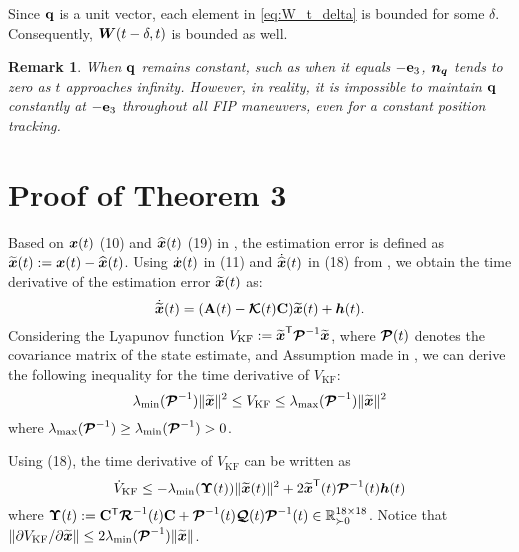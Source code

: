 \documentclass[journal,onecolumn]{IEEEtran}
\newtheorem{theorem}{Theorem}
\newtheorem{remark}{Remark}
\begin{document}
Since $\dir$ is a unit vector, each element in \eqref{eq:W_t_delta} is bounded for some $\delta$.
Consequently, $\boldsymbol{W}(t-\delta,t)$ is bounded as well.

\begin{remark}
	When $\dir$ remains constant, such as when it equals $-\ez$, $\boldsymbol{n_{q}}$ tends to zero as $t$ approaches infinity.
	However, in reality, it is impossible to maintain $\dir$ constantly at $-\ez$ throughout all FIP maneuvers, even for a constant position tracking.
\end{remark}

\section{Proof of Theorem 3}\label{sec:x_tilde}
%
Based on $\boldsymbol{x}(t)$ (10) and $\widehat{\boldsymbol{x}}(t)$ (19) in \cite{2024_Yang_TIE}, the estimation error is defined as $\widetilde{\boldsymbol{x}}(t):=\boldsymbol{x}(t)-\widehat{\boldsymbol{x}}(t)$.
%
%
Using $\dot{{\boldsymbol{x}}}(t)$ in (11) and $\dot{\widehat{\boldsymbol{x}}}(t)$ in (18) from \cite{2024_Yang_TIE}, we obtain the time derivative of the estimation error $\widetilde{\boldsymbol{x}}(t)$ as:
%
\begin{equation}
	\dot{\widetilde{\boldsymbol{x}}}(t)=({\bf A}(t)-\boldsymbol{\mathcal{K}} (t){\bf C})\widetilde{\boldsymbol{x}}(t) +\boldsymbol{h}(t).
\end{equation}
%
Considering the Lyapunov function $V_{\text{KF}}:=\widetilde{\boldsymbol{x}}^\mathsf{T}\boldsymbol{\mathcal{P}}^{-1}\widetilde{\boldsymbol{x}}$, 
where $\boldsymbol{\mathcal{P}}(t)$ denotes the covariance matrix of the state estimate, and Assumption made in \cite{2024_Yang_TIE}, we can derive the following inequality for the time derivative of $V_{\text{KF}}$:
%
\begin{equation}
	\lambda_{\min}(\boldsymbol{\mathcal{P}}^{-1})\|\widetilde{\boldsymbol{x}}\|^2 \leq V_{\text{KF}} \leq \lambda_{\max}(\boldsymbol{\mathcal{P}}^{-1})\|\widetilde{\boldsymbol{x}}\|^2
\end{equation}
%
where $\lambda_{\max}(\boldsymbol{\mathcal{P}}^{-1})\geq\lambda_{\min}(\boldsymbol{\mathcal{P}}^{-1})>0$.

Using (18), the time derivative of $V_{\text{KF}}$ can be written as
%
\begin{equation}
	\dot{V}_{\text{KF}}\leq-\lambda_{\min}(\boldsymbol{\Upsilon}(t))\|\widetilde{\boldsymbol{x}}(t)\|^2+2\widetilde{\boldsymbol{x}}^\mathsf{T}(t)\boldsymbol{\mathcal{P}}^{-1}(t)\boldsymbol{h}(t)
\end{equation}
% 
where $\boldsymbol{\Upsilon}(t):={\mathbf C}^\mathsf{T} \boldsymbol{\mathcal{R}} ^{-1}(t){\mathbf C}+\boldsymbol{\mathcal{P}}^{-1}(t)\boldsymbol{\mathcal{Q}} (t)\boldsymbol{\mathcal{P}}^{-1}(t)\in\mathbb{R}^{18\times18}_{\succ0}$.
Notice that $\|\partial V_{\text{KF}}/\partial \widetilde{\boldsymbol{x}}\|\leq 2\lambda_{\min}(\boldsymbol{\mathcal{P}}^{-1})\|\widetilde{\boldsymbol{x}}\|$.
\end{document}
